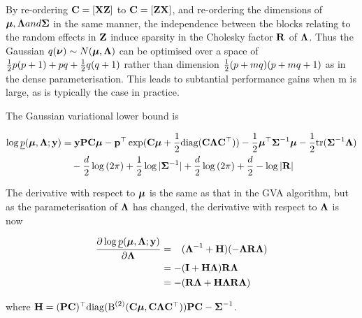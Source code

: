 \documentclass{article}[12pt]
\begin{document}


By re-ordering ${\bf C} = [{\bf X} {\bf Z}]$ to ${\bf C} = [{\bf Z} {\bf X}]$, and re-ordering the dimensions
of ${\boldsymbol \mu}, {\boldsymbol \Lambda} and {\boldsymbol \Sigma}$ in the same manner, the independence between the
blocks relating to the random effects in ${\bf Z}$ induce sparsity in the Cholesky factor ${\bf R}$
of ${\boldsymbol \Lambda}$. Thus the Gaussian $q({\boldsymbol \nu}) \sim N({\boldsymbol \mu}, {\boldsymbol \Lambda})$ can be optimised over a space
of ${\frac{1}{2}} p (p + 1) + pq + {\frac{1}{2}} q (q + 1)$ rather than dimension ${\frac{1}{2}} (p + mq) (p + mq + 1)$ 
as in the dense parameterisation. This leads to subtantial performance gains when m is large,
as is typically the case in practice. %

\noindent The Gaussian variational lower bound is

\begin{align*}
\log \underline{p}({\boldsymbol \mu}, {\boldsymbol \Lambda}; {\bf y}) &= {\bf y}{\bf P}{\bf C} {\boldsymbol \mu} - {\bf p}^\top \exp({\bf C} {\boldsymbol \mu} + {\frac{1}{2}} \text{diag}({\bf C} {\boldsymbol \Lambda} {\bf C}^\top)) - {\frac{1}{2}} {\boldsymbol \mu}^\top {\boldsymbol\Sigma}^{-1} {\boldsymbol \mu} - {\frac{1}{2}} \text{tr}{({\boldsymbol\Sigma}^{-1} {\boldsymbol\Lambda})} \\
&\quad- \frac{d}{2} \log{(2 \pi)} + {\frac{1}{2}} \log{|{\boldsymbol\Sigma}^{-1}|} + \frac{d}{2} \log{(2 \pi)} + \frac{d}{2} - \log{|{\bf R}|}
\end{align*}

\noindent The derivative with respect to ${\boldsymbol \mu}$ is the same as that in the GVA 
algorithm, but as the parameterisation of ${\boldsymbol \Lambda}$ has changed, the  
derivative with respect to ${\boldsymbol \Lambda}$ is now

\begin{align*}
\frac{\partial \log \underline{p}({\boldsymbol \mu}, {\boldsymbol \Lambda}; {\bf y})}{\partial {\boldsymbol\Lambda}}
&= \hphantom{-}({\boldsymbol \Lambda}^{-1} + {\bf H})(-{\boldsymbol \Lambda} {\bf R} {\boldsymbol \Lambda}) \\
&= -({\bf I} + {\bf H}{\boldsymbol \Lambda}){\bf R}{\boldsymbol \Lambda} \\
&= - ({\bf R}{\boldsymbol \Lambda} + {\bf H}{\boldsymbol \Lambda}{\bf R}{\boldsymbol \Lambda})
\end{align*} 

\noindent where ${\bf H} = ({\bf P} {\bf C})^\top \text{diag}({\text{B}}^{(2)}({\bf C} {\boldsymbol \mu}, {\bf C} {\boldsymbol \Lambda} {\bf C}^\top)) {\bf P} {\bf C} - {\boldsymbol \Sigma}^{-1}$.
\end{document}

